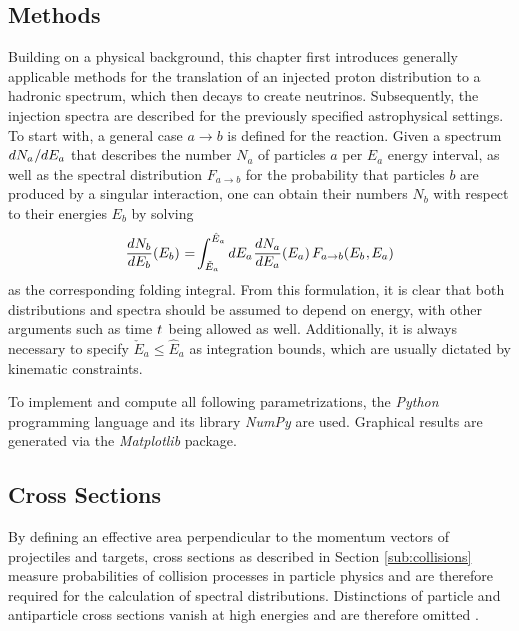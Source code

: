 \begin{spacing}{0.975}
	\chapter{Methods}
	\label{ch:methods}
	
	Building on a physical background, this chapter first introduces generally applicable methods for the translation of an
	injected proton distribution to a hadronic spectrum, which then decays to create neutrinos. Subsequently, the injection
	spectra are described for the previously specified astrophysical settings. To start with, a general case $a \rightarrow b$
	is defined for the reaction. Given a spectrum $dN_a \kern+0.5pt / \kern-0.25pt dE_a$ that describes the number $N_a$ of
	particles $a$ per $E_a$ energy interval, as well as the spectral distribution $F_{a \rightarrow b}$ for the probability
	that particles $b$ are produced by a singular interaction, one can obtain their numbers $N_b$ with respect to their
	energies $E_b$ by solving
	\begin{equation}
		\frac{dN_b}{\raisebox{0.5ex}{$dE_b$}} (E_b) \kern+0.5pt = \kern-1.5pt\int_{\check{E}_a}^{\hat{E}_a} dE_a
		\kern+0.5pt \frac{dN_a}{\raisebox{0.5ex}{$dE_a$}} (E_a) \kern+1.5pt F_{a \rightarrow b} (E_b \kern+0.5pt, \kern-0.5pt E_a)
		\label{eqn:folding}
	\end{equation}
	as the corresponding folding integral. From this formulation, it is clear that both distributions and spectra should be assumed
	to depend on energy, with other arguments such as time $t \kern+0.5pt$ being allowed as well. Additionally, it is always necessary
	to specify $\check{E}_a \leq \hat{E}_a$ as integration bounds, which are usually dictated by kinematic constraints.
	
	To implement and compute all following parametrizations, the \emph{Python} programming language and its library \emph{NumPy}
	are used. Graphical results are generated via the \emph{Matplotlib} package.
	
	
	
	\section{Cross Sections}
	\label{sec:cross}
	
	By defining an effective area perpendicular to the momentum vectors of projectiles and targets, cross sections as described
	in Section \ref{sub:collisions} measure probabilities of collision processes in particle physics and are therefore required
	for the calculation of spectral distributions. Distinctions of particle and antiparticle cross sections vanish at high
	energies and are therefore omitted \cite{pdg}.
	

\end{spacing}
